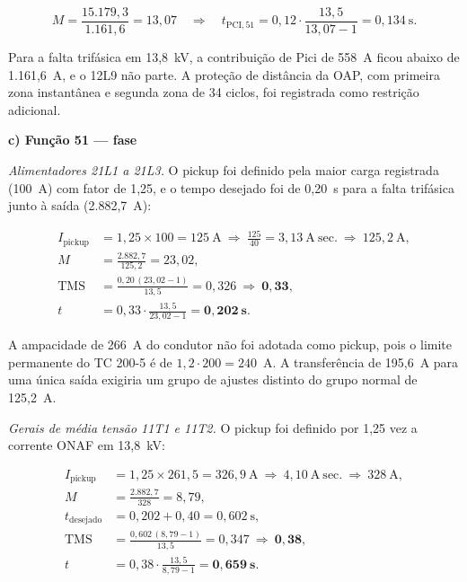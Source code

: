 \begin{equation}
    M=\frac{15.179{,}3}{1.161{,}6}=13{,}07
    \quad\Rightarrow\quad
    t_{\mathrm{PCI},51}=0{,}12\cdot\frac{13{,}5}{13{,}07-1}=0{,}134~\mathrm{s}.
    \label{eq:oc_tempo_pci}
\end{equation}

Para a falta trifásica em 13,8~kV, a contribuição de Pici de 558~A ficou abaixo de 1.161,6~A, e o 12L9 não parte. A proteção de distância da OAP, com primeira zona instantânea e segunda zona de 34 ciclos, foi registrada como restrição adicional.

\textbf{c) Função 51 — fase}

\textit{Alimentadores 21L1 a 21L3.} O pickup foi definido pela maior carga registrada (100~A) com fator de 1,25, e o tempo desejado foi de 0,20~s para a falta trifásica junto à saída (2.882,7~A):

\begin{equation}
    \begin{aligned}
        I_{\mathrm{pickup}}&=1{,}25\times100=125~\mathrm{A}
            \ \Rightarrow\ \tfrac{125}{40}=3{,}13~\mathrm{A~sec.}
            \ \Rightarrow\ 125{,}2~\mathrm{A},\\
        M&=\frac{2.882{,}7}{125{,}2}=23{,}02,\\
        \mathrm{TMS}&=\frac{0{,}20\,(23{,}02-1)}{13{,}5}=0{,}326
            \ \Rightarrow\ \mathbf{0{,}33},\\
        t&=0{,}33\cdot\frac{13{,}5}{23{,}02-1}=\mathbf{0{,}202~s}.
    \end{aligned}
    \label{eq:oc_51_alim}
\end{equation}

A ampacidade de 266~A do condutor não foi adotada como pickup, pois o limite permanente do TC 200-5 é de $1{,}2\cdot200=240$~A. A transferência de 195,6~A para uma única saída exigiria um grupo de ajustes distinto do grupo normal de 125,2~A.

\textit{Gerais de média tensão 11T1 e 11T2.} O pickup foi definido por 1,25 vez a corrente ONAF em 13,8~kV:

\begin{equation}
    \begin{aligned}
        I_{\mathrm{pickup}}&=1{,}25\times261{,}5=326{,}9~\mathrm{A}
            \ \Rightarrow\ 4{,}10~\mathrm{A~sec.}
            \ \Rightarrow\ 328~\mathrm{A},\\
        M&=\frac{2.882{,}7}{328}=8{,}79,\\
        t_{\mathrm{desejado}}&=0{,}202+0{,}40=0{,}602~\mathrm{s},\\
        \mathrm{TMS}&=\frac{0{,}602\,(8{,}79-1)}{13{,}5}=0{,}347
            \ \Rightarrow\ \mathbf{0{,}38},\\
        t&=0{,}38\cdot\frac{13{,}5}{8{,}79-1}=\mathbf{0{,}659~s}.
    \end{aligned}
    \label{eq:oc_51_geral}
\end{equation}

